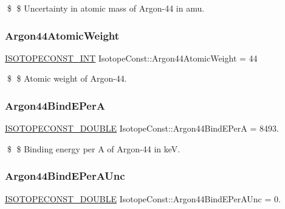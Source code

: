 \$ \$ Uncertainty in atomic mass of Argon-\/44 in amu. \mbox{\label{group___isotope_const-_argon-_ar44_ga011f3f81a9188e06dd934c834c772c92}} 
\subsubsection{\texorpdfstring{Argon44\+Atomic\+Weight}{Argon44AtomicWeight}}
{\footnotesize\ttfamily \mbox{\hyperlink{group___isotope_const-_macros_ga5f18360b3e99483a35c32d789e62621c}{I\+S\+O\+T\+O\+P\+E\+C\+O\+N\+S\+T\+\_\+\+I\+NT}} Isotope\+Const\+::\+Argon44\+Atomic\+Weight = 44}

\$ \$ Atomic weight of Argon-\/44. \mbox{\label{group___isotope_const-_argon-_ar44_ga84b4a827135bd01ffc2742d3bf77cbdc}} 
\subsubsection{\texorpdfstring{Argon44\+Bind\+E\+PerA}{Argon44BindEPerA}}
{\footnotesize\ttfamily \mbox{\hyperlink{group___isotope_const-_macros_ga8f45a7272ce02c0b4c65c44636ed719a}{I\+S\+O\+T\+O\+P\+E\+C\+O\+N\+S\+T\+\_\+\+D\+O\+U\+B\+LE}} Isotope\+Const\+::\+Argon44\+Bind\+E\+PerA = 8493.}

\$ \$ Binding energy per A of Argon-\/44 in keV. \mbox{\label{group___isotope_const-_argon-_ar44_gac5287aaf17e96228c62853e0e75ac0b6}} 
\subsubsection{\texorpdfstring{Argon44\+Bind\+E\+Per\+A\+Unc}{Argon44BindEPerAUnc}}
{\footnotesize\ttfamily \mbox{\hyperlink{group___isotope_const-_macros_ga8f45a7272ce02c0b4c65c44636ed719a}{I\+S\+O\+T\+O\+P\+E\+C\+O\+N\+S\+T\+\_\+\+D\+O\+U\+B\+LE}} Isotope\+Const\+::\+Argon44\+Bind\+E\+Per\+A\+Unc = 0.}

